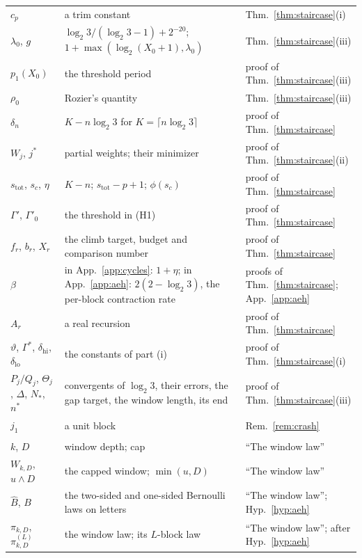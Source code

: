 \documentclass[11pt]{article}
\theoremstyle{remark}
\newcommand{\LL}{\log_2 3}
\newcommand{\stot}{s_{\mathrm{tot}}}
\begin{document}
{\begin{longtable}{>{\raggedright\arraybackslash}p{}>{\raggedright\arraybackslash}p{}>{\raggedright\arraybackslash}p{}}
$c_p$ & a trim constant & Thm.~\ref{thm:staircase}(i) \\
$\lambda_0$, $g$ & $\LL/(\LL-1) + 2^{-20}$; $1 + \max(\log_2(X_0+1), \lambda_0)$ & Thm.~\ref{thm:staircase}(iii) \\
$p_1(X_0)$ & the threshold period & proof of Thm.~\ref{thm:staircase}(iii) \\
$\rho_0$ & Rozier's quantity & Thm.~\ref{thm:staircase}(iii) \\
$\delta_n$ & $K - n\LL$ for $K = \lceil n\LL\rceil$ & proof of Thm.~\ref{thm:staircase} \\
$W_j$, $j^\ast$ & partial weights; their minimizer & proof of Thm.~\ref{thm:staircase}(ii) \\
$\stot$, $s_c$, $\eta$ & $K - n$; $\stot - p + 1$; $\phi(s_c)$ & proof of Thm.~\ref{thm:staircase} \\
$\Gamma'$, $\Gamma'_0$ & the threshold in (H1) & proof of Thm.~\ref{thm:staircase} \\
$f_r$, $b_r$, $X_r$ & the climb target, budget and comparison number & proof of Thm.~\ref{thm:staircase} \\
$\beta$ & in App.~\ref{app:cycles}: $1 + \eta$; in App.~\ref{app:aeh}: $2(2 - \LL)$, the per-block contraction rate & proofs of Thm.~\ref{thm:staircase}; App.~\ref{app:aeh} \\
$A_r$ & a real recursion & proof of Thm.~\ref{thm:staircase} \\
$\vartheta$, $\Gamma^\ast$, $\delta_{\mathrm{hi}}$, $\delta_{\mathrm{lo}}$ & the constants of part (i) & proof of Thm.~\ref{thm:staircase}(i) \\
$P_j/Q_j$, $\Theta_j$, $\Delta$, $N_\ast$, $n^\ast$ & convergents of $\LL$, their errors, the gap target, the window length, its end & proof of Thm.~\ref{thm:staircase}(iii) \\
$j_1$ & a unit block & Rem.~\ref{rem:crash} \\
\multicolumn{3}{l}{\emph{The hypothesis (Appendix~\ref{app:aeh})}} \\
$k$, $D$ & window depth; cap & ``The window law'' \\
$W_{k,D}$, $u \wedge D$ & the capped window; $\min(u, D)$ & ``The window law'' \\
$\hat B$, $B$ & the two-sided and one-sided Bernoulli laws on letters & ``The window law''; Hyp.~\ref{hyp:aeh} \\
$\pi_{k,D}$, $\pi^{(L)}_{k,D}$ & the window law; its $L$-block law & ``The window law''; after Hyp.~\ref{hyp:aeh} \\

\end{longtable}}
\end{document}
